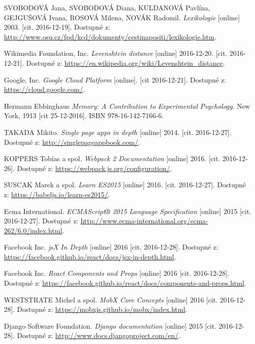 \documentclass[a4paper,11pt,titlepage,fleqn]{article}
\begin{document}
\begin{thebibliography}{99}
        SVOBODOVÁ Jana, SVOBODOVÁ Diana, KULDANOVÁ Pavlína, GEJGUŠOVÁ Ivana, ROSOVÁ Milena, NOVÁK Radomil. \textit{Lexikologie} [online] 2003. [cit. 2016-12-19]. Dostupné z: \url{http://www.osu.cz/fpd/kcd/dokumenty/cestinapositi/lexikologie.htm}.

         Wikimedia Foundation, Inc. \textit{Levenshtein distance} [online] 2016-12-20. [cit. 2016-12-21]. Dostupné z: \url{https://en.wikipedia.org/wiki/Levenshtein_distance}.
        
        Google, Inc. \textit{Google Cloud Platform} [online]. [cit 2016-12-21]. Dostupné z: \url{https://cloud.google.com/}.

		Hermann Ebbinghaus \textit{Memory: A Contribution to Experimental Psychology}. New York, 1913 [cit 25-12-2016]. ISBN 978-16-142-7166-6.

        TAKADA Mikito. \textit{Single page apps in depth} [online] 2014. [cit. 2016-12-27]. Dostupné z: \url{http://singlepageappbook.com/}.

        KOPPERS Tobias a spol. \textit{Webpack 2 Documentation} [online] 2016. [cit. 2016-12-26]. Dostupné z: \url{https://webpack.js.org/configuration/}.

        SUSCAK Marek a spol. \textit{Learn ES2015} [online] 2016. [cit. 2016-12-27]. Dostupné z: \url{https://babeljs.io/learn-es2015/}.
        
        Ecma International. \textit{ECMAScript® 2015 Language Specification} [online] 2015 [cit. 2016-12-27]. Dostupné z: \url{http://www.ecma-international.org/ecma-262/6.0/index.html}.

        Facebook Inc. \textit{\gls{js}X In Depth} [online] 2016 [cit. 2016-12-28]. Dostupné z: \url{https://facebook.github.io/react/docs/jsx-in-depth.html}.

        Facebook Inc. \textit{React Components and Props} [online] 2016 [cit. 2016-12-28]. Dostupné z: \url{https://facebook.github.io/react/docs/components-and-props.html}.
        
        WESTSTRATE Michel a spol. \textit{MobX Core Concepts} [online] 2016 [cit. 2016-12-28].
        Dostupné z: \url{https://mobxjs.github.io/mobx/index.html}.

        Django Software Foundation. \textit{Django documentation} [online] 2015 [cit. 2016-12-28]. Dostupné z: \url{http://www.docs.djangoproject.com/en/}.


\end{thebibliography}
\end{document}
